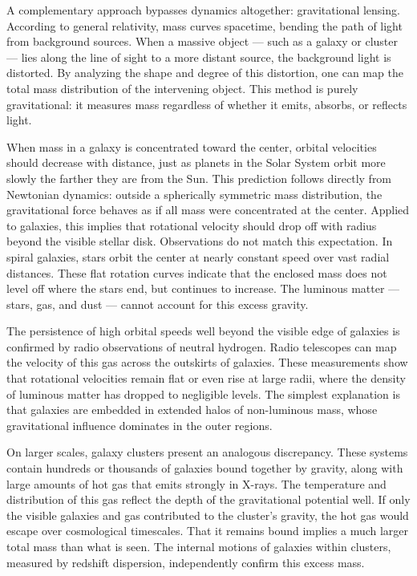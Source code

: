A complementary approach bypasses dynamics altogether: gravitational lensing. According to general relativity, mass curves spacetime, bending the path of light from background sources. When a massive object — such as a galaxy or cluster — lies along the line of sight to a more distant source, the background light is distorted. By analyzing the shape and degree of this distortion, one can map the total mass distribution of the intervening object. This method is purely gravitational: it measures mass regardless of whether it emits, absorbs, or reflects light.

When mass in a galaxy is concentrated toward the center, orbital velocities should decrease with distance, just as planets in the Solar System orbit more slowly the farther they are from the Sun. This prediction follows directly from Newtonian dynamics: outside a spherically symmetric mass distribution, the gravitational force behaves as if all mass were concentrated at the center. Applied to galaxies, this implies that rotational velocity should drop off with radius beyond the visible stellar disk. Observations do not match this expectation. In spiral galaxies, stars orbit the center at nearly constant speed over vast radial distances. These flat rotation curves indicate that the enclosed mass does not level off where the stars end, but continues to increase. The luminous matter — stars, gas, and dust — cannot account for this excess gravity.

The persistence of high orbital speeds well beyond the visible edge of galaxies is confirmed by radio observations of neutral hydrogen. Radio telescopes can map the velocity of this gas across the outskirts of galaxies. These measurements show that rotational velocities remain flat or even rise at large radii, where the density of luminous matter has dropped to negligible levels. The simplest explanation is that galaxies are embedded in extended halos of non-luminous mass, whose gravitational influence dominates in the outer regions.

On larger scales, galaxy clusters present an analogous discrepancy. These systems contain hundreds or thousands of galaxies bound together by gravity, along with large amounts of hot gas that emits strongly in X-rays. The temperature and distribution of this gas reflect the depth of the gravitational potential well. If only the visible galaxies and gas contributed to the cluster’s gravity, the hot gas would escape over cosmological timescales. That it remains bound implies a much larger total mass than what is seen. The internal motions of galaxies within clusters, measured by redshift dispersion, independently confirm this excess mass.

